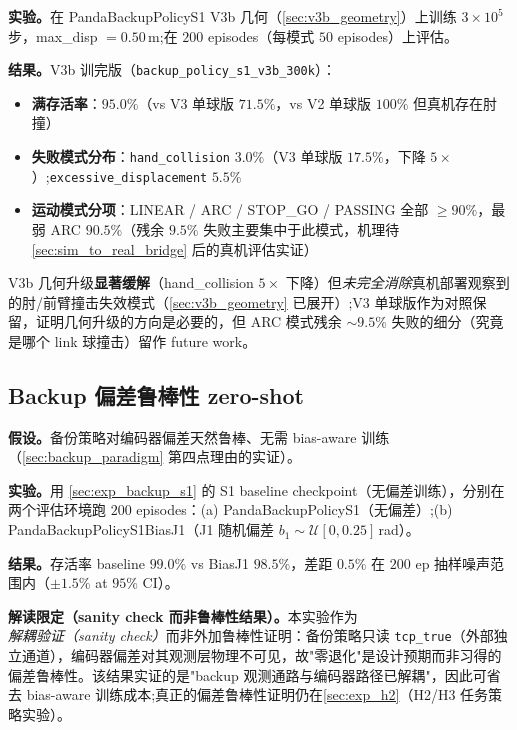 \textbf{实验。}在 PandaBackupPolicyS1 V3b 几何（\cref{sec:v3b_geometry}）上训练 $3 \times 10^5$ 步，max\_disp $= 0.50$\,m;在 $200$ episodes（每模式 $50$ episodes）上评估。

\textbf{结果。}V3b 训完版（\texttt{backup\_policy\_s1\_v3b\_300k}）：
\begin{itemize}
  \item \textbf{满存活率}：$95.0\%$（vs V3 单球版 $71.5\%$，vs V2 单球版 $100\%$ 但真机存在肘撞）
  \item \textbf{失败模式分布}：\texttt{hand\_collision} $3.0\%$（V3 单球版 $17.5\%$，下降 $5\times$）;\texttt{excessive\_displacement} $5.5\%$
  \item \textbf{运动模式分项}：LINEAR / ARC / STOP\_GO / PASSING 全部 $\geq 90\%$，最弱 ARC $90.5\%$（残余 $9.5\%$ 失败主要集中于此模式，机理待\cref{sec:sim_to_real_bridge} 后的真机评估实证）
\end{itemize}

V3b 几何升级\textbf{显著缓解}（hand\_collision $5\times$ 下降）但\emph{未完全消除}真机部署观察到的肘/前臂撞击失效模式（\cref{sec:v3b_geometry} 已展开）;V3 单球版作为对照保留，证明几何升级的方向是必要的，但 ARC 模式残余 $\sim 9.5\%$ 失败的细分（究竟是哪个 link 球撞击）留作 future work。

\subsection{Backup 偏差鲁棒性 zero-shot}\label{sec:exp_backup_bias}

\textbf{假设。}备份策略对编码器偏差天然鲁棒、无需 bias-aware 训练（\cref{sec:backup_paradigm} 第四点理由的实证）。

\textbf{实验。}用 \cref{sec:exp_backup_s1} 的 S1 baseline checkpoint（无偏差训练），分别在两个评估环境跑 $200$ episodes：(a) PandaBackupPolicyS1（无偏差）;(b) PandaBackupPolicyS1BiasJ1（J1 随机偏差 $b_1 \sim \mathcal{U}[0, 0.25]$\,rad）。

\textbf{结果。}存活率 baseline $99.0\%$ vs BiasJ1 $98.5\%$，差距 $0.5\%$ 在 $200$ ep 抽样噪声范围内（$\pm 1.5\%$ at $95\%$ CI）。

\textbf{解读限定（sanity check 而非鲁棒性结果）。}本实验作为\emph{解耦验证（sanity check）}而非外加鲁棒性证明：备份策略只读 \texttt{tcp\_true}（外部独立通道），编码器偏差对其观测层物理不可见，故"零退化"是设计预期而非习得的偏差鲁棒性。该结果实证的是"backup 观测通路与编码器路径已解耦"，因此可省去 bias-aware 训练成本;真正的偏差鲁棒性证明仍在\cref{sec:exp_h2}（H2/H3 任务策略实验）。

